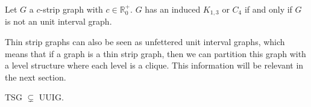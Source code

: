 \begin{theorem}
  \label{theo:induced_TSG}
  Let $G$ a $c$-strip graph with $c \in \mathbb{R}_0^+$. $G$ has an induced $K_{1,3}$ or $C_4$ if and only if $G$ is not an unit interval graph.
\end{theorem}

Thin strip graphs can also be seen as unfettered unit interval graphs, which means that if a graph is a thin strip graph, then we can partition this graph with a level structure where each level is a clique. This information will be relevant in the next section.

\begin{theorem}
  TSG $\subsetneq$ UUIG.
\end{theorem}

